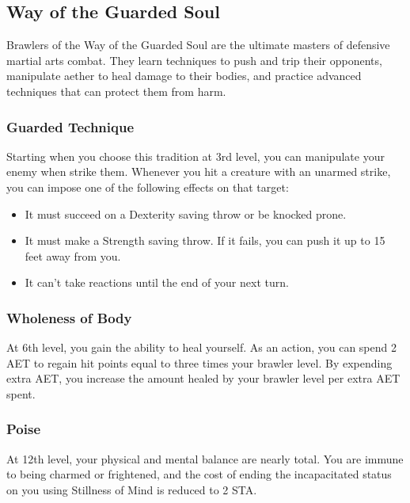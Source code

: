 \subsection{Way of the Guarded Soul}

Brawlers of the Way of the Guarded Soul are the ultimate masters of defensive martial arts combat. They learn techniques to push and trip their opponents, manipulate aether to heal damage to their bodies, and practice advanced techniques that can protect them from harm.

\subsubsection{Guarded Technique}

Starting when you choose this tradition at 3rd level, you can manipulate your enemy when strike them. Whenever you hit a creature with an unarmed strike, you can impose one of the following effects on that target:
\begin{itemize}
\item It must succeed on a Dexterity saving throw or be knocked prone.
\item It must make a Strength saving throw. If it fails, you can push it up to 15 feet away from you.
\item It can't take reactions until the end of your next turn.
\end{itemize}

\subsubsection{Wholeness of Body}

At 6th level, you gain the ability to heal yourself. As an action, you can spend 2 AET to regain hit points equal to three times your brawler level. By expending extra AET, you increase the amount healed by your brawler level per extra AET spent.

\subsubsection{Poise}
At 12th level, your physical and mental balance are nearly total. You are immune to being charmed or frightened, and the cost of ending the incapacitated status on you using Stillness of Mind is reduced to 2 STA.

